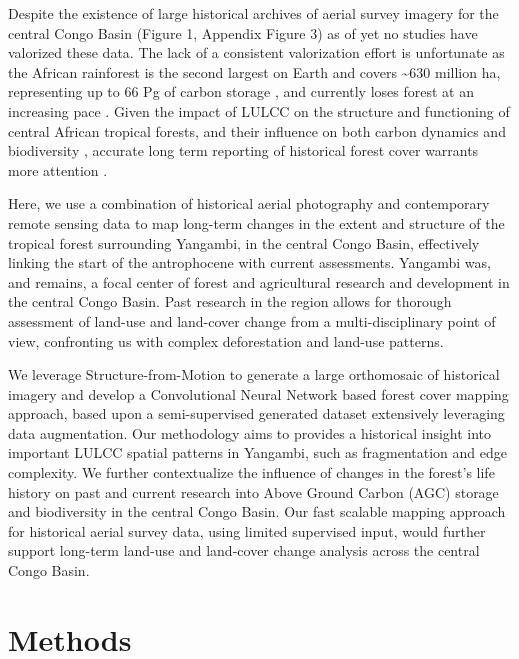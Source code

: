 \documentclass[remote sensing,article,submit,moreauthors,pdftex]{mdpi}
\begin{document}
Despite the existence of large historical archives of aerial survey
imagery for the central Congo Basin (Figure 1, Appendix Figure 3) as of
yet no studies have valorized these data. The lack of a consistent
valorization effort is unfortunate as the African rainforest is the
second largest on Earth and covers \textasciitilde{}630 million ha,
representing up to 66 Pg of carbon storage \citep{Lewis2009b}, and
currently loses forest at an increasing pace \citep{butsic2015}. Given
the impact of LULCC on the structure and functioning of central African
tropical forests, and their influence on both carbon dynamics
\citep{Kearsley2013} and biodiversity \citep{vandeperre2018}, accurate
long term reporting of historical forest cover warrants more attention
\citep{willcock2016}.

Here, we use a combination of historical aerial photography and
contemporary remote sensing data to map long-term changes in the extent
and structure of the tropical forest surrounding Yangambi, in the
central Congo Basin, effectively linking the start of the antrophocene
\citep{lewis2015} with current assessments. Yangambi was, and remains, a
focal center of forest and agricultural research and development in the
central Congo Basin. Past research in the region allows for thorough
assessment of land-use and land-cover change from a multi-disciplinary
point of view, confronting us with complex deforestation and land-use
patterns.

We leverage Structure-from-Motion to generate a large orthomosaic of
historical imagery and develop a Convolutional Neural Network based
forest cover mapping approach, based upon a semi-supervised generated
dataset extensively leveraging data augmentation. Our methodology aims
to provides a historical insight into important LULCC spatial patterns
in Yangambi, such as fragmentation and edge complexity. We further
contextualize the influence of changes in the forest's life history on
past and current research into Above Ground Carbon (AGC) storage
\citep{Kearsley2013} and biodiversity \citep{vandeperre2018} in the
central Congo Basin. Our fast scalable mapping approach for historical
aerial survey data, using limited supervised input, would further
support long-term land-use and land-cover change analysis across the
central Congo Basin.

\hypertarget{methods}{%
\section{Methods}\label{methods}}
\end{document}
